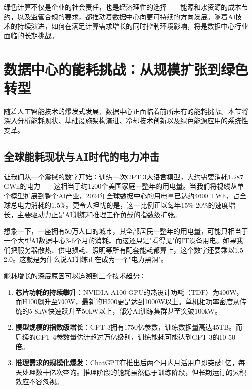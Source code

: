 绿色计算不仅是企业的社会责任，也是经济理性的选择——能源和水资源的成本节约，以及监管合规的要求，都推动着数据中心向更可持续的方向发展。随着AI技术的持续演进，如何在满足计算需求增长的同时控制环境影响，将是数据中心行业面临的长期挑战。

\section{数据中心的能耗挑战：从规模扩张到绿色转型}\label{sec:energy-challenge}

随着人工智能技术的爆发式发展，数据中心正面临着前所未有的能耗挑战。本节将深入分析能耗现状、基础设施架构演进、冷却技术创新以及绿色能源应用的系统性变革。

\subsection{全球能耗现状与AI时代的电力冲击}

让我们从一个震撼的数字开始：训练一次GPT-3大语言模型，大约需要消耗1.287 GWh的电力——这相当于约1200个美国家庭一整年的用电量。当我们将视线从单个模型扩展到整个AI产业，2024年全球数据中心的用电量已达约4600 TWh，占全球总电力消耗的1.5\%。更令人担忧的是，这一比例正以每年15\%-20\%的速度增长，主要驱动力正是AI训练和推理工作负载的指数级扩张。

\begin{analogy}
想象一下，一座拥有50万人口的城市，其全部居民一整年的用电量，可能只相当于一个大型AI数据中心3-6个月的消耗。而这还只是"看得见"的IT设备用电。如果我们把服务器散热、供电损耗、照明等所有配套能耗都算上，这个数字还要乘以1.5-2.0。这就是为什么说AI训练正在成为一个"电力黑洞"。
\end{analogy}

能耗增长的深层原因可以追溯到三个技术趋势：

\begin{enumerate}
    \item \textbf{芯片功耗的持续攀升}：NVIDIA A100 GPU的热设计功耗（TDP）为400W，而H100飙升至700W，最新的H200更是达到1000W以上。单机柜功率密度从传统的5-8kW快速跃升至50kW以上，部分AI训练集群甚至突破100kW。

    \item \textbf{模型规模的指数级增长}：GPT-3拥有1750亿参数，训练数据量高达45TB。而后续的GPT-4参数量估计超过万亿级别，训练能耗可能达到GPT-3的10-50倍。

    \item \textbf{推理需求的规模化爆发}：ChatGPT在推出后两个月内月活用户即突破1亿，每天处理数十亿次查询。推理阶段的能耗虽然低于训练阶段，但长期运行的累积效应不容忽视。
\end{enumerate}

